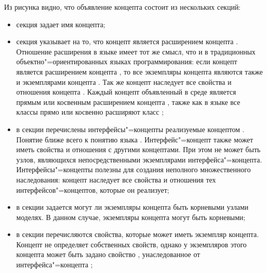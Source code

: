 Из рисунка видно, что объявление концепта состоит из нескольких секций:
\begin{itemize}
 \item секция  задает имя концепта;

 \item секция  указывает на то, что концепт является расширением концепта .
 Отношение расширения в языке  имеет тот же смысл, что и в традиционных объектно"=ориентированных
 языках программирования: если концепт  является расширением концепта , то все экземпляры концепта 
 являются также и экземплярами концепта . Так же концепт  наследует все свойства и отношения концепта
 .  Каждый концепт объявленный в среде \MPS{} является прямым или косвенным расширением концепта
 ,  также как в языке  все классы прямо или косвенно расширяют класс ;

 \item в секции  перечислены интерфейсы"=концепты реализуемые
 концептом . Понятие  ближе всего к понятию  языка  
 \cite{scala}.
 Интерфейс"=концепт также может иметь свойства и отношения с другими концептами. При этом не может быть узлов,
 являющихся непосредственными экземплярами интерфейса"=концепта. Интерфейсы"=концепты полезны для создания неполного
 множественного наследования: концепт наследует все свойства и отношения тех интерфейсов"=концептов, которые он
 реализует;

 \item в секции  задается могут ли экземпляры концепта быть корневыми узлами моделях. В
 данном случае, экземпляры концепта  могут быть корневыми;

 \item в секции  перечисляются свойства, которые может иметь экземпляр концепта. Концепт 
 не определяет собственных свойств, однако у экземпляров этого концепта может быть задано свойство 
, унаследованное от интерфейса"=концепта ;


\end{itemize}
